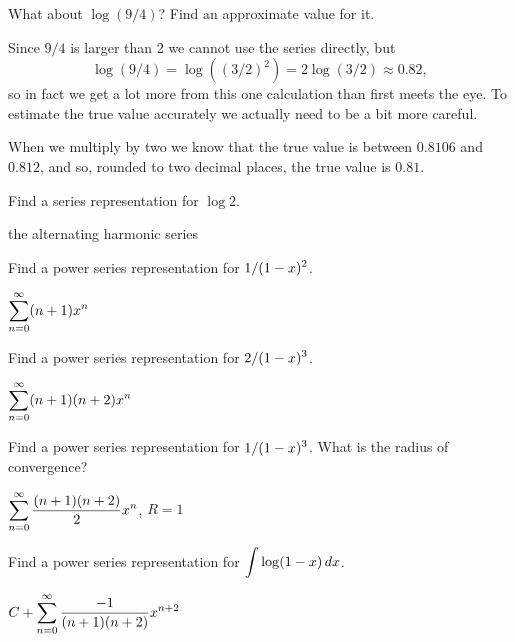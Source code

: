 \begin{example}
What about $\log(9/4)$?   Find an approximate value for it.
\end{example}

\begin{solution}
Since $9/4$ is larger than 2 we cannot use the
series directly, but
\[
\log(9/4)=\log((3/2)^2)=2\log(3/2)\approx 0.82,
\]
so in fact we get a lot more from this one calculation than first
meets the eye. To estimate the true value accurately we actually need
to be a bit more careful.

When we multiply by two we know that the true value is between
$0.8106$ and $0.812$, and so, rounded to two decimal places, the true
value is $0.81$.
\end{solution}

\begin{exercises}

\begin{exercise} Find a series representation for $\log 2$.
\begin{answer} the alternating harmonic series
\end{answer}\end{exercise}

\begin{exercise} Find a power series representation for $\displaystyle 1/(1-x)^2$.
\begin{answer} $\displaystyle\sum_{n=0}^\infty (n+1)x^n$
\end{answer}\end{exercise}

\begin{exercise} Find a power series representation for $\displaystyle 2/(1-x)^3$.
\begin{answer} $\displaystyle\sum_{n=0}^\infty (n+1)(n+2)x^n$
\end{answer}\end{exercise}

\begin{exercise} Find a power series representation for $\displaystyle 1/(1-x)^3$.
What is the radius of convergence?
\begin{answer} $\displaystyle\sum_{n=0}^\infty {(n+1)(n+2)\over 2}x^n$, $R=1$
\end{answer}\end{exercise}

\begin{exercise} Find a power series representation for $\displaystyle\int\log(1-x)\,dx$.
\begin{answer} $\displaystyle C+\sum_{n=0}^\infty {-1\over (n+1)(n+2)}x^{n+2}$ 
\end{answer}\end{exercise}

\end{exercises}

